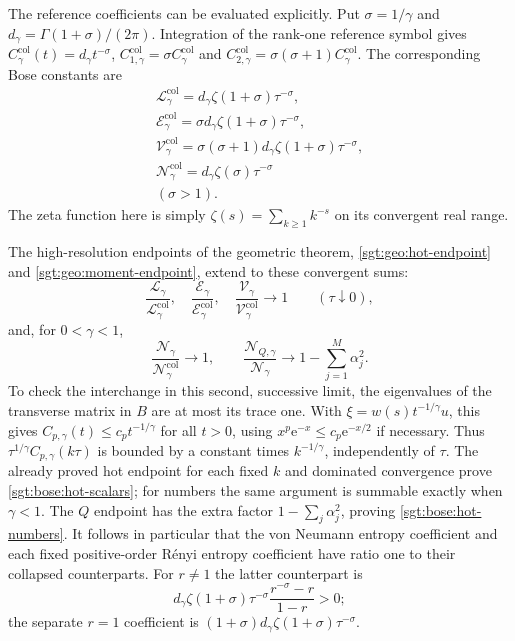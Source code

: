 \documentclass[aps,pra,reprint,superscriptaddress,longbibliography]{revtex4-2}
\newcommand{\ee}{\mathrm e}
\begin{document}
The reference coefficients can be evaluated explicitly.  Put
$\sigma=1/\gamma$ and $d_\gamma=\Gamma(1+\sigma)/(2\pi)$.
Integration of the rank-one reference symbol gives
$C_\gamma^{\mathrm{col}}(t)=d_\gamma t^{-\sigma}$,
$C_{1,\gamma}^{\mathrm{col}}=\sigma C_\gamma^{\mathrm{col}}$ and
$C_{2,\gamma}^{\mathrm{col}}=\sigma(\sigma+1)C_\gamma^{\mathrm{col}}$.
The corresponding Bose constants are
\begin{gather}
 \mathcal L_\gamma^{\mathrm{col}}
  =d_\gamma\zeta(1+\sigma)\tau^{-\sigma},
 \\
\mathcal E_\gamma^{\mathrm{col}}
  =\sigma d_\gamma\zeta(1+\sigma)\tau^{-\sigma},\nonumber\\
 \mathcal V_\gamma^{\mathrm{col}}
  =\sigma(\sigma+1)d_\gamma\zeta(1+\sigma)\tau^{-\sigma},
 \\
\mathcal N_\gamma^{\mathrm{col}}
  =d_\gamma\zeta(\sigma)\tau^{-\sigma}\\
(\sigma>1).
 \label{sgt:bose:reference-coefficients}
\end{gather}
The zeta function here is simply $\zeta(s)=\sum_{k\ge1}k^{-s}$ on
its convergent real range.

The high-resolution endpoints of the geometric theorem,
\eqref{sgt:geo:hot-endpoint} and \eqref{sgt:geo:moment-endpoint},
extend to these convergent sums:
\begin{equation}
 \frac{\mathcal L_\gamma}{\mathcal L_\gamma^{\mathrm{col}}},\quad
 \frac{\mathcal E_\gamma}{\mathcal E_\gamma^{\mathrm{col}}},\quad
 \frac{\mathcal V_\gamma}{\mathcal V_\gamma^{\mathrm{col}}}
 \longrightarrow1\qquad(\tau\downarrow0),
 \label{sgt:bose:hot-scalars}
\end{equation}
and, for $0<\gamma<1$,
\begin{equation}
 \frac{\mathcal N_\gamma}{\mathcal N_\gamma^{\mathrm{col}}}
   \longrightarrow1,
 \qquad
 \frac{\mathcal N_{Q,\gamma}}{\mathcal N_\gamma}
   \longrightarrow1-\sum_{j=1}^M\alpha_j^2.
 \label{sgt:bose:hot-numbers}
\end{equation}
To check the interchange in this second, successive limit, the eigenvalues
of the transverse matrix in $B$ are at most its trace one.  With
$\xi=w(s)t^{-1/\gamma}u$, this gives
$C_{p,\gamma}(t)\le c_p t^{-1/\gamma}$ for all $t>0$, using
$x^p\ee^{-x}\le c_p\ee^{-x/2}$ if necessary.  Thus
$\tau^{1/\gamma}C_{p,\gamma}(k\tau)$ is bounded by a constant times
$k^{-1/\gamma}$, independently of $\tau$.  The already proved hot
endpoint for each fixed $k$ and dominated convergence prove
\eqref{sgt:bose:hot-scalars}; for numbers the same argument is summable
exactly when $\gamma<1$.  The $Q$ endpoint has the extra factor
$1-\sum_j\alpha_j^2$, proving \eqref{sgt:bose:hot-numbers}.
It follows in particular that the von Neumann entropy coefficient and
each fixed positive-order R\'enyi entropy coefficient have ratio one
to their collapsed counterparts.  For $r\ne1$ the latter counterpart is
\begin{equation}
 d_\gamma\zeta(1+\sigma)\tau^{-\sigma}
                  \frac{r^{-\sigma}-r}{1-r}>0;
 \label{sgt:bose:reference-renyi}
\end{equation}
the separate $r=1$ coefficient is
$(1+\sigma)d_\gamma\zeta(1+\sigma)\tau^{-\sigma}$.
\end{document}
